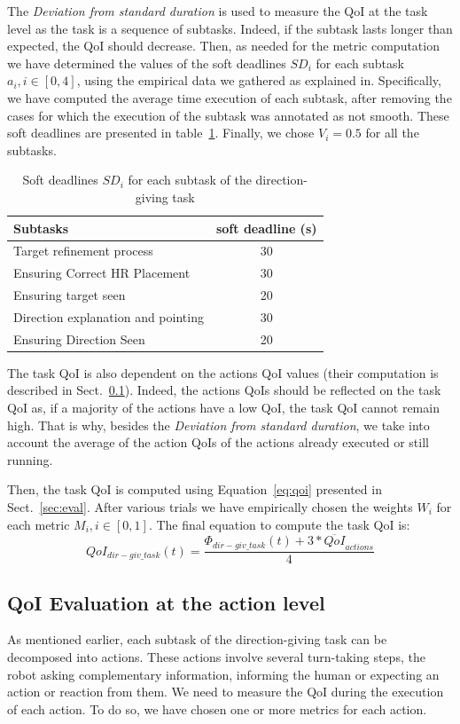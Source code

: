 \documentclass[a4paper,11pt,twoside]{StyleThese}
\begin{document}
The \textit{Deviation from standard duration} is used to measure the QoI at the task level as the task is a sequence of subtasks. Indeed, if the subtask lasts longer than expected, the QoI should decrease. Then, as needed for the metric computation we have determined the values of the soft deadlines $SD_i$ for each subtask $a_i, i \in [0,4] $, using the empirical data we gathered as explained in. Specifically, we have computed the average time execution of each subtask, after removing the cases for which the execution of the subtask was annotated as not smooth. These soft deadlines are presented in table~\ref{tab:dl}. Finally, we chose $V_i=0.5$ for all the subtasks.
\begin{table}[ht]
	\centering
	\begin{tabular}{l|c}
		\hline
		Subtasks & soft deadline (s) \\ 
		\hline
		Target refinement process &  30 \\ 
		Ensuring Correct HR Placement   & 30 \\ 
		Ensuring target seen  & 20 \\ 
		Direction explanation and pointing & 30 \\
		Ensuring Direction Seen & 20\\
		\hline
	\end{tabular}
	\caption{Soft deadlines $SD_i$ for each subtask of the direction-giving task}
	\label{tab:dl}
\end{table}

The task QoI is also dependent on the actions QoI values (their computation is described in Sect.~\ref{subsec:action_qoi}). Indeed, the actions QoIs should be reflected on the task QoI as, if a majority of the actions have a low QoI, the task QoI cannot remain high. That is why, besides the\textit{ Deviation from standard duration}, we take into account the average of the action QoIs of the actions already executed or still running.

Then, the task QoI is computed using Equation~\eqref{eq:qoi} presented in Sect.~\ref{sec:eval}. After various trials we have empirically chosen the weights $W_i$ for each metric $M_i, i \in [0,1]$. The final equation to compute the task QoI is:
\[QoI_{dir-giv\_task}(t)=\frac{ \Phi_{dir-giv\_task}(t) + 3 * \overline{QoI}_{actions} }{4}\]

\subsection{QoI Evaluation at the action level}\label{subsec:action_qoi}
As mentioned earlier, each subtask of the direction-giving task can be decomposed into actions. These actions involve several turn-taking steps, the robot asking complementary information, informing the human or expecting an action or reaction from them. We need to measure the QoI during the execution of each action. To do so, we have chosen one or more metrics for each action. 
\end{document}
